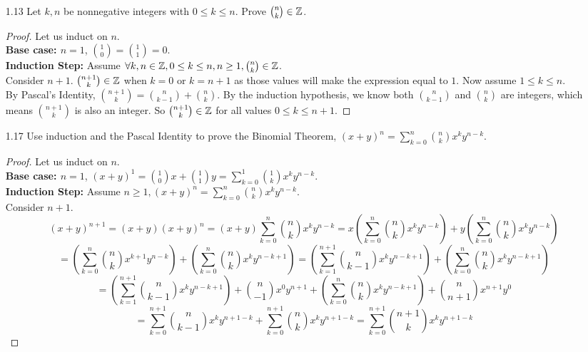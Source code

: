 \documentclass[12pt]{article}
\begin{document}
\begin{itemize}
		\item [1.13] Let $k, n$ be nonnegative integers with $0 \leq k \leq n$. Prove $\binom{n}{k} \in \mathbb{Z}$.
		
		\begin{proof}
			Let us induct on $n$.\\
			\textbf{Base case: $n=1$}, $\binom{1}{0} = \binom{1}{1} = 0$.\\
			\textbf{Induction Step:} Assume $\forall k,n\in\mathbb{Z}, 0\leq k \leq n, n\geq 1, \binom{n}{k}\in\mathbb{Z}$.\\
			Consider $n+1$. $\binom{n+1}{k}\in\mathbb{Z}$ when $k=0$ or $k=n+1$ as those values will make the expression equal to $1$. Now assume $1\leq k \leq n$.\\
			By Pascal's Identity, $\binom{n+1}{k} = \binom{n}{k-1} + \binom{n}{k}$. By the induction hypothesis, we know both $\binom{n}{k-1}$ and $\binom{n}{k}$ are integers, which means $\binom{n+1}{k}$ is also an integer.
			So $\binom{n+1}{k}\in\mathbb{Z}$ for all values $0\leq k \leq n+1$.
		\end{proof}
		
		\item [1.17]  Use induction and the Pascal Identity to prove the Binomial Theorem, $(x+y)^n = \sum_{k=0}^{n}\binom{n}{k}x^ky^{n-k}$.
		\begin{proof}
			Let us induct on $n$.\\
			\textbf{Base case: $n=1$}, $(x+y)^1 = \binom{1}{0}x + \binom{1}{1}y = \sum_{k=0}^{1}\binom{1}{k}x^ky^{n-k}$.\\
			\textbf{Induction Step:} Assume $n\geq1, (x+y)^n = \sum_{k=0}^{n}\binom{n}{k}x^ky^{n-k}$.\\
			Consider $n+1$.
			\[(x+y)^{n+1} = (x+y)(x+y)^n = (x+y)\sum_{k=0}^{n}\binom{n}{k}x^ky^{n-k} = x\left(\sum_{k=0}^{n}\binom{n}{k}x^ky^{n-k}\right) + y\left(\sum_{k=0}^{n}\binom{n}{k}x^ky^{n-k}\right)\]
			\[= \left(\sum_{k=0}^{n}\binom{n}{k}x^{k+1}y^{n-k}\right) + \left(\sum_{k=0}^{n}\binom{n}{k}x^ky^{n-k+1}\right) = \left(\sum_{k=1}^{n+1}\binom{n}{k-1}x^{k}y^{n-k+1}\right) + \left(\sum_{k=0}^{n}\binom{n}{k}x^ky^{n-k+1}\right)\]
			\[= \left(\sum_{k=1}^{n+1}\binom{n}{k-1}x^{k}y^{n-k+1}\right) + \binom{n}{-1}x^{0}y^{n+1} + \left(\sum_{k=0}^{n}\binom{n}{k}x^ky^{n-k+1}\right) + \binom{n}{n+1}x^{n+1}y^{0}\]
			\[= \sum_{k=0}^{n+1}\binom{n}{k-1}x^ky^{n+1-k} + \sum_{k=0}^{n+1}\binom{n}{k}x^ky^{n+1-k}
			= \sum_{k=0}^{n+1}\binom{n+1}{k}x^ky^{n+1-k}\]
		\end{proof}
		

\end{itemize}
\end{document}
